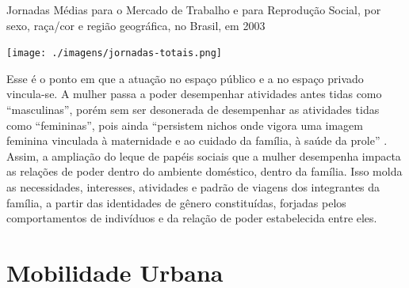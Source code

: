 \begin{grafico}[htb]%
    \caption{\label{graf:jornadas-completas}Jornadas Médias para o Mercado de Trabalho e para Reprodução Social, por sexo, raça/cor e região geográfica, no Brasil, em 2003}%
    \begin{center}%
        \texttt{[image: ./imagens/jornadas-totais.png]}%
    \end{center}%
\end{grafico}%


Esse é o ponto em que a atuação no espaço público e a no espaço privado vincula-se.
A mulher passa a poder desempenhar atividades antes tidas como ``masculinas'', porém sem ser desonerada de desempenhar as atividades tidas como ``femininas'', pois  ainda ``persistem nichos onde vigora uma imagem feminina vinculada à maternidade e ao cuidado da família, à saúde da prole'' \cite[p.94]{BLAY2001}. 
Assim, a ampliação do leque de papéis sociais que a mulher desempenha impacta as relações de poder dentro do ambiente doméstico, dentro da família. Isso molda as necessidades, interesses, atividades e padrão de viagens dos integrantes da família, a partir das identidades de gênero constituídas, forjadas pelos comportamentos de indivíduos e da relação de poder estabelecida entre eles.

\clearpage
\section{Mobilidade Urbana}

